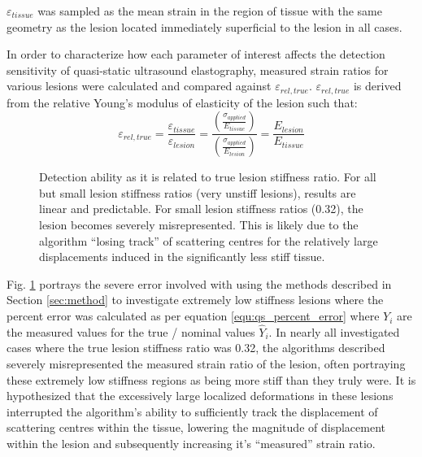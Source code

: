			$\varepsilon_{tissue}$ was sampled as the mean strain in the region of tissue with the same geometry as the lesion located immediately superficial to the lesion in all cases.

			In order to characterize how each parameter of interest affects the detection sensitivity of quasi-static ultrasound elastography, measured strain ratios for various lesions were calculated and compared against $\varepsilon_{rel,true}$. $\varepsilon_{rel,true}$ is derived from the relative Young's modulus of elasticity of the lesion such that:
			\begin{equation}
				\varepsilon_{rel,true} = \frac{\varepsilon_{tissue}}{\varepsilon_{lesion}} = \frac{\left(\frac{\sigma_{applied}}{E_{tissue}}\right)}{\left(\frac{\sigma_{applied}}{E_{lesion}}\right)} = \frac{E_{lesion}}{E_{tissue}}
			\end{equation}

			\begin{figure}[!htb]
				\centering
				\caption[Detection ability as it is related to true lesion stiffness ratio]{Detection ability as it is related to true lesion stiffness ratio. For all but small lesion stiffness ratios (very unstiff lesions), results are linear and predictable. For small lesion stiffness ratios (0.32), the lesion becomes severely misrepresented. This is likely due to the algorithm ``losing track'' of scattering centres for the relatively large displacements induced in the significantly less stiff tissue.}
				\label{fig:error_stiffness_ratio}
			\end{figure}

			Fig. \ref{fig:error_stiffness_ratio} portrays the severe error involved with using the methods described in Section \ref{sec:method} to investigate extremely low stiffness lesions where the percent error was calculated as per equation \ref{equ:qs_percent_error} where $Y_i$ are the measured values for the true / nominal values $\hat{Y}_i$. In nearly all investigated cases where the true lesion stiffness ratio was 0.32, the algorithms described severely misrepresented the measured strain ratio of the lesion, often portraying these extremely low stiffness regions as being more stiff than they truly were. It is hypothesized that the excessively large localized deformations in these lesions interrupted the algorithm's ability to sufficiently track the displacement of scattering centres within the tissue, lowering the magnitude of displacement within the lesion and subsequently increasing it's ``measured'' strain ratio.

